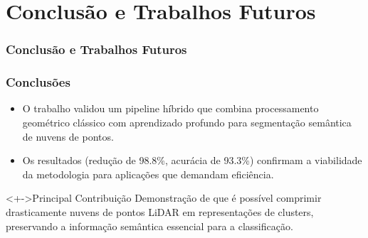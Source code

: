 \documentclass[aspectratio=169,t,xcolor=table]{beamer}
\begin{document}
\section{Conclusão e Trabalhos Futuros}

\begin{frame}
    \frametitle{Conclusão e Trabalhos Futuros}
\end{frame}

\begin{frame}
    \frametitle{Conclusões}
    \begin{itemize}
        \item<+-> O trabalho validou um pipeline híbrido que combina
              processamento geométrico clássico com aprendizado profundo para
              segmentação semântica de nuvens de pontos.
        \item<+-> Os resultados (redução de 98.8\%, acurácia de 93.3\%)
              confirmam a viabilidade da metodologia para aplicações que
              demandam eficiência.
    \end{itemize}
    \begin{alertblock}<+->{Principal Contribuição}
        Demonstração de que é possível comprimir drasticamente nuvens de pontos
        LiDAR em representações de clusters, preservando a informação semântica
        essencial para a classificação.
    \end{alertblock}
\end{frame}
\end{document}
